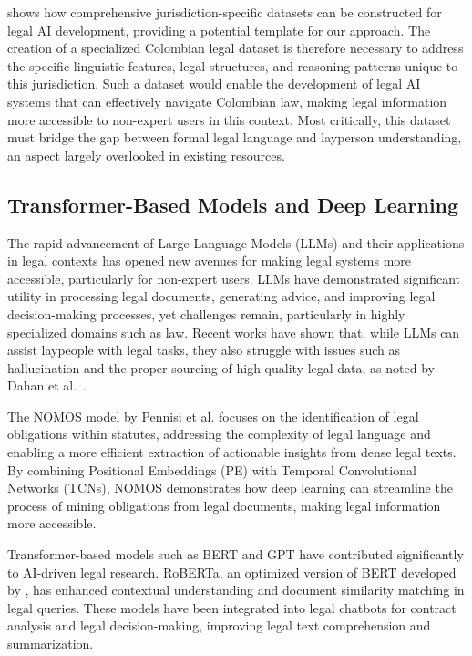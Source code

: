 shows how comprehensive jurisdiction-specific datasets can be constructed for 
legal AI development, providing a potential template for our approach.
The creation of a specialized Colombian legal dataset is therefore necessary 
to address the specific linguistic features, legal structures, and reasoning 
patterns unique to this jurisdiction. Such a dataset would enable the development 
of legal AI systems that can effectively navigate Colombian law, making legal 
information more accessible to non-expert users in this context. Most critically, 
this dataset must bridge the gap between formal legal language and layperson 
understanding, an aspect largely overlooked in existing resources.

\subsection{Transformer-Based Models and Deep Learning}
The rapid advancement of Large Language Models (LLMs) and their applications 
in legal contexts has opened new avenues for making legal systems more 
accessible, particularly for non-expert users. LLMs have demonstrated 
significant utility in processing legal documents, generating advice, 
and improving legal decision-making processes, yet challenges remain, 
particularly in highly specialized domains such as law. Recent works have 
shown that, while LLMs can assist laypeople with legal tasks, they also 
struggle with issues such as hallucination and the proper sourcing of 
high-quality legal data, as noted by Dahan et al.~\cite{dahan2023lawyers}.

The NOMOS model by Pennisi et al. 
\cite{pennisi-etal-2023-nomos} focuses on the identification of legal 
obligations within statutes, addressing the complexity of legal language and 
enabling a more efficient extraction of actionable insights from dense legal 
texts. By combining Positional Embeddings (PE) with Temporal Convolutional 
Networks (TCNs), NOMOS demonstrates how deep learning can streamline the 
process of mining obligations from legal documents, making legal information 
more accessible.

Transformer-based models such as BERT and GPT have contributed significantly 
to AI-driven legal research. RoBERTa, an optimized version of BERT developed 
by \cite{liu2019robertarobustlyoptimizedbert}, has enhanced contextual understanding 
and document similarity matching in legal queries. These models have been 
integrated into legal chatbots for contract analysis and legal decision-making, 
improving legal text comprehension and summarization.

